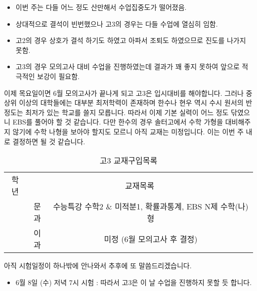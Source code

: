 \documentclass[idxtotoc,hyperref,openany]{labbook} %
\begin{document}

\begin{itemize}
	\item 이번 주는 다들 어느 정도 산만해서 수업집중도가 떨어졌음.
	\item 상대적으로 결석이 빈번했으나 고3의 경우는 다들 수업에 열심히 임함.
	\item 고2의 경우 상호가 결석 하기도 하였고 아파서 조퇴도 하였으므로 진도를 나가지 못함.
	\item 고3의 경우 모의고사 대비 수업을 진행하였는데 결과가 꽤 좋지 못하여 앞으로 적극적인 보강이 필요함.
\end{itemize}



\hspace{1cm}이제 목요일이면 6월 모의고사가 끝나게 되고 고3은 입시대비를 해야합니다. 그러나 중상위 이상의 대학들에는 대부분 최저학력이 존재하며 
한수나 현우 역시 수시 원서의 반 정도는 최저가 있는 학교를 쓸지 모릅니다. 따라서 이제 기본 실력이 어느 정도 닦였으니 EBS를 풀어야 할 것 같습니다.
다만 한수의 경우 솔터고에서 수학 가형을 대비해주지 않기에 수학 나형을 보아야 할지도 모르니 아직 교재는 미정입니다. 이는 이번 주 내로 결정하면 될 것 같습니다.

\begin{table}[H]
\centering
\begin{adjustbox}{width=\textwidth}
 \begin{tabular}{c||c|c}
 \toprule
 \midrule
 학년 & \multicolumn{2}{c}{교재목록} \\
 \hhline{=||==}
 \multirow{2}{*}{고3} & 문과 & 수능특강 수학2 \& 미적분1, 확률과통계, EBS N제 수학(나)형  \\ \hhline{~--}
		      & 이과 & 미정 (6월 모의고사 후 결정) \\
 \hline
  
 \end{tabular}

\end{adjustbox}
\caption{\label{tab:iv} 고3 교재구입목록}
\end{table}


아직 시험일정이 하나밖에 안나와서 추후에 또 말씀드리겠습니다.
\begin{itemize}
 \item 6월 8일 (수) 저녁 7시 시험 : 따라서 고3은 이 날 수업을 진행하지 못할 듯 합니다.
\end{itemize}
\end{document}
